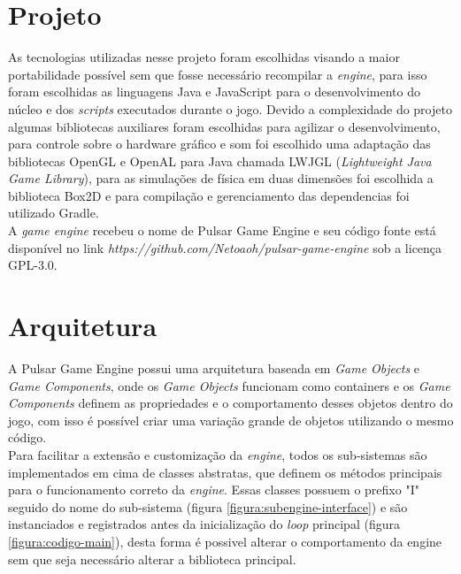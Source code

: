 \documentclass[12pt,	openright, twoside,	a4paper, english, french, spanish, brazil]{abntex2}
\begin{document}
%
%

\section{Projeto}

As tecnologias utilizadas nesse projeto foram escolhidas visando a maior portabilidade possível sem que fosse necessário recompilar a \textit{engine}, para isso foram escolhidas as linguagens Java e JavaScript para o desenvolvimento do núcleo e dos \textit{scripts} executados durante o jogo. Devido a complexidade do projeto algumas bibliotecas auxiliares foram escolhidas para agilizar o desenvolvimento, para controle sobre o hardware gráfico e som foi escolhido uma adaptação das bibliotecas OpenGL e OpenAL para Java chamada LWJGL (\textit{Lightweight Java Game Library}), para as simulações de física em duas dimensões foi escolhida a biblioteca Box2D e para compilação e gerenciamento das dependencias foi utilizado Gradle. \\
A \textit{game engine} recebeu o nome de Pulsar Game Engine e seu código fonte está disponível no link \textit{https://github.com/Netoaoh/pulsar-game-engine} sob a licença GPL-3.0.

%
%

\section{Arquitetura}

A Pulsar Game Engine possui uma arquitetura baseada em \textit{Game Objects} e \textit{Game Components}, onde os \textit{Game Objects} funcionam como containers e os \textit{Game Components} definem as propriedades e o comportamento desses objetos dentro do jogo, com isso é possível criar uma variação grande de objetos utilizando o mesmo código. \\
Para facilitar a extensão e customização da \textit{engine}, todos os sub-sistemas são implementados em cima de classes abstratas, que definem os métodos principais para o funcionamento correto da \textit{engine}. Essas classes possuem o prefixo "I" seguido do nome do sub-sistema (figura \ref{figura:subengine-interface}) e são instanciados e registrados antes da inicialização do \textit{loop} principal (figura \ref{figura:codigo-main}), desta forma é possivel alterar o comportamento da engine sem que seja necessário alterar a biblioteca principal.
\end{document}
